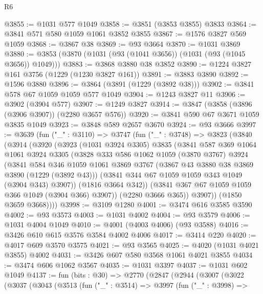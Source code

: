 \begin{lexlean}{R6}
\begin{coremodule}
@3855 := @1031 @577 @1049
@3858 := @3851 (@3853 @3855) @3833
@3864 := @3841 @571 @580 @1059 @1061 @3852 @3855
@3867 := @1576 @3827 @569 @1059
@3868 := @3867 @38
@3869 := @93 @3664
@3870 := @1031 @3869
@3880 := @3853 (@3870 (@1031 (@93 (@1041 @3656)) (@1031 (@93 (@1045 @3656)) @1049)))
@3883 := @3868 @3880 @38 @3852
@3890 := @1224 @3827 @161 @3756 (@1229 (@1230 @3827 @161))
@3891 := @3883 @3890
@3892 := @1596 @3880
@3896 := @3864 (@3891 (@1229 (@3892 @38)))
@3902 := @3841 @578 @67 @1059 @1059 @577 @1049
@3904 := @1243 @3827 @11
@3906 := @3902 (@3904 @577)
@3907 := @1249 @3827
@3914 := @3847 (@3858 (@3896 (@3906 @3907)) (@2280 @3657 @576))
@3920 := @3841 @590 @67 @3671 @1059 @3835 @1049
@3923 := @3848 @589 @2657 @3670
@3924 := @93 @3666
@3997 := @3639
    (fun ("_" : @3110) =>
    @3747
      (fun ("_" : @3748) =>
      @3823
        (@3840
          (@3914
            (@3920
              (@3923
                (@1031 @3924 @3305)
                @3835
                (@3841
                  @587
                  @369
                  @1064
                  @1061
                  @3924
                  @3305
                  (@3828
                    @333
                    @586
                    @1062
                    @1059
                    (@3870 @3767)
                    @3924
                    (@3841
                      @584
                      @346
                      @1059
                      @1061
                      @3869
                      @3767
                      (@3867 @43 @3880 @38 @3869 @3890 (@1229 (@3892 @43)))
                      (@3841 @344 @67 @1059 @1059 @343 @1049 (@3904 @343) @3907))
                    (@1816 @3664 @342))
                  (@3841 @367 @67 @1059 @1059 @366 @1049 (@3904 @366) @3907))
                (@2280 @3666 @365))
              @3907))
          (@1850 @3659 @3668))))
@3998 := @3109 @1280
@4001 := @3474 @616 @3585 @3590
@4002 := @93 @3573
@4003 := @1031 @4002
@4004 := @93 @3579
@4006 := @1031 @4004 @1049
@4010 := @4001 (@4003 @4006) (@93 @3588)
@4016 := @3426 @610 @615 @3576 @3584 @4002 @4006
@4017 := @3414 @220
@4020 := @4017 @609 @3570 @3575
@4021 := @93 @3565
@4025 := @4020 (@1031 @4021 @3855) @4002
@4031 := @3426 @607 @580 @3568 @1061 @4021 @3855
@4034 := @3474 @606 @1062 @3567
@4035 := @1031 @3397
@4037 := @1031 @602 @1049
@4137 := fun (bits : @30) =>
  @2770
    (@2847
      (@2944
        (@3007
          (@3022
            (@3037
              (@3043
                (@3513
                  (fun ("_" : @3514) =>
                  @3997
                    (fun ("_" : @3998) =>

\end{coremodule}
\end{lexlean}
